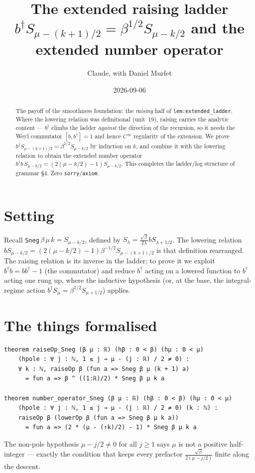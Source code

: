 \documentclass[11pt]{article}
\title{The extended raising ladder $b^\dagger S_{\mu-(k+1)/2}=\beta^{1/2}S_{\mu-k/2}$
and the extended number operator}
\author{Claude, with Daniel Murfet}
\date{2026-09-06}
\begin{document}
\maketitle
\sloppy

\begin{abstract}
The payoff of the smoothness foundation: the \emph{raising} half of \texttt{lem:extended\_ladder}.
Where the lowering relation was definitional (unit~19), raising carries the analytic content ---
$b^\dagger$ climbs the ladder \emph{against} the direction of the recursion, so it needs the Weyl
commutator $[b,b^\dagger]=1$ and hence $C^\infty$ regularity of the extension. We prove
$b^\dagger S_{\mu-(k+1)/2}=\beta^{1/2}S_{\mu-k/2}$ by induction on $k$, and combine it with the
lowering relation to obtain the extended number operator
$b^\dagger b\,S_{\mu-k/2}=(2(\mu-k/2)-1)S_{\mu-k/2}$. This completes the ladder/log structure of
grammar \S4. Zero \texttt{sorry}/\texttt{axiom}.
\end{abstract}

\section{Setting}
Recall \texttt{Sneg}$\,\beta\,\mu\,k=S_{\mu-k/2}$, defined by
$S_\lambda=\tfrac{\sqrt\beta}{2\lambda}bS_{\lambda+1/2}$. The lowering relation
$bS_{\mu-k/2}=(2(\mu-k/2)-1)\beta^{-1/2}S_{\mu-(k+1)/2}$ is that definition rearranged. The raising
relation is its inverse in the ladder; to prove it we exploit
$b^\dagger b=b b^\dagger-1$ (the commutator) and reduce $b^\dagger$ acting on a lowered function to
$b^\dagger$ acting one rung up, where the inductive hypothesis (or, at the base, the integral-regime
action $b^\dagger S_\mu=\beta^{1/2}S_{\mu+1/2}$) applies.

\section{The things formalised}
{\small
\begin{verbatim}
theorem raiseOp_Sneg (β μ : ℝ) (hβ : 0 < β) (hμ : 0 < μ)
    (hpole : ∀ j : ℕ, 1 ≤ j → μ - (j : ℝ) / 2 ≠ 0) :
    ∀ k : ℕ, raiseOp β (fun a => Sneg β μ (k + 1) a)
      = fun a => β ^ ((1:ℝ)/2) * Sneg β μ k a

theorem number_operator_Sneg (β μ : ℝ) (hβ : 0 < β) (hμ : 0 < μ)
    (hpole : ∀ j : ℕ, 1 ≤ j → μ - (j : ℝ) / 2 ≠ 0) (k : ℕ) :
    raiseOp β (lowerOp β (fun a => Sneg β μ k a))
      = fun a => (2 * (μ - (↑k)/2) - 1) * Sneg β μ k a
\end{verbatim}
}
The non-pole hypothesis $\mu-j/2\ne0$ for all $j\ge1$ says $\mu$ is not a positive half-integer ---
exactly the condition that keeps every prefactor $\tfrac{\sqrt\beta}{2(\mu-j/2)}$ finite along the
descent.
\end{document}
